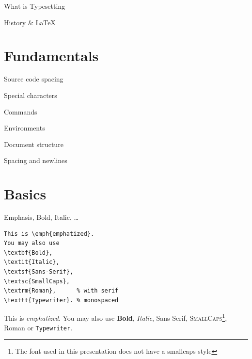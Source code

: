 \documentclass[xetex, onlymath]{beamer}
\begin{document}
\begin{frame}{What is Typesetting}
\end{frame}

\begin{frame}{History \& \textrm{\LaTeX}}
\end{frame}

\section{Fundamentals}
\begin{frame}{Source code spacing}
\end{frame}

\begin{frame}{Special characters}
\end{frame}

\begin{frame}{Commands}
\end{frame}

\begin{frame}{Environments}
\end{frame}

\begin{frame}{Document structure}
\end{frame}

\begin{frame}{Spacing and newlines}
\end{frame}

\section{Basics}
\begin{frame}[fragile]{Emphasis, Bold, Italic, \ldots}
\begin{lstlisting}
This is \emph{emphatized}.
You may also use
\textbf{Bold},
\textit{Italic},
\textsf{Sans-Serif},
\textsc{SmallCaps},
\textrm{Roman},      % with serif
\texttt{Typewriter}. % monospaced
\end{lstlisting}

\begin{exampleblock}{}
This is \emph{emphatized}.
You may also use
\textbf{Bold},
\textit{Italic},
\textsf{Sans-Serif},
\textsc{SmallCaps}\footnote{The font used in this presentation does not have a smallcaps style},
\textrm{Roman} or
\texttt{Typewriter}.
\end{exampleblock}
\end{frame}
\end{document}
